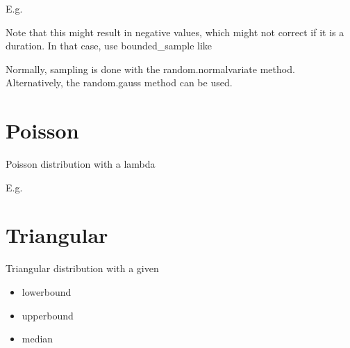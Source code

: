 \documentclass[letterpaper,10pt,english]{sphinxmanual}
\begin{document}
E.g.

\begin{sphinxVerbatim}[commandchars=\\\{\}]
     
\end{sphinxVerbatim}

Note that this might result in negative values, which might not correct if it is a duration. In that case,
use bounded\_sample like

\begin{sphinxVerbatim}[commandchars=\\\{\}]
 
\end{sphinxVerbatim}

Normally, sampling is done with the random.normalvariate method. Alternatively, the random.gauss method can be used.


\section{Poisson}
\label{\detokenize{Distributions:poisson}}
Poisson distribution with a lambda

E.g.

\begin{sphinxVerbatim}[commandchars=\\\{\}]
    
\end{sphinxVerbatim}


\section{Triangular}
\label{\detokenize{Distributions:triangular}}
Triangular distribution with a given
\begin{itemize}
\item {} 
lowerbound

\item {} 
upperbound

\item {} 
median

\end{itemize}
\end{document}
